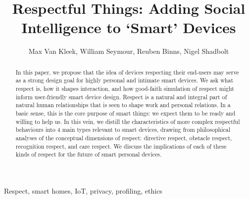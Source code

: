 \documentclass{IETpaper}
\begin{document}

\title{Respectful Things: Adding Social Intelligence to `Smart' Devices}

\author{Max Van Kleek, William Seymour, Reuben Binns, Nigel Shadbolt}



\maketitle

\begin{keywords}
Respect, smart homes, IoT, privacy, profiling, ethics 
\end{keywords}

\begin{abstract}
In this paper, we propose that the idea of devices respecting their end-users may serve as a strong design goal for highly personal and intimate smart devices. We ask what respect is, how it shapes interaction, and how good-faith simulation of respect might inform user-friendly smart device design. Respect is a natural and integral part of natural human relationships that is seen to shape work and personal relations. In a basic sense, this is the core purpose of smart things: we expect them to be ready and willing to help us. In this vein, we distill the characteristics of more complex respectful behaviours into 4 main types relevant to smart devices, drawing from philosophical analyses of the conceptual dimensions of respect: directive respect, obstacle respect, recognition respect, and care respect. We discuss the implications of each of these kinds of respect for the future of smart personal devices.
\end{abstract}
\end{document}
